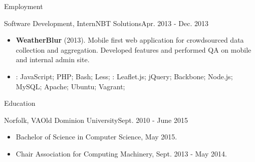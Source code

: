 \documentclass[]{mcdowellcv}
\begin{document}
\begin{cvsection}{Employment}
        \begin{cvsubsection}{Software Development, Intern}{NBT Solutions}{Apr. 2013 - Dec. 2013}
            \begin{itemize}
                \item \textbf{WeatherBlur} (2013). Mobile first web application for crowdsourced data collection and aggregation. Developed features and performed QA on mobile and internal admin site.
            \end{itemize}
            \begin{itemize}
                 \item {}: JavaScript; PHP; Bash; Less;\newline
                : Leaflet.js; jQuery; Backbone; Node.js; MySQL; Apache; Ubuntu; Vagrant;
            \end{itemize}
        \end{cvsubsection}

    \end{cvsection}

    \begin{cvsection}{Education}
        \begin{cvsubsection}{Norfolk, VA}{Old Dominion University}{Sept. 2010 - June 2015}
            \begin{itemize}
                \item  Bachelor of Science in Computer Science, May 2015.
                \item Chair Association for Computing Machinery, Sept. 2013 - May 2014.
            \end{itemize}
        \end{cvsubsection}
    \end{cvsection}
\end{document}
